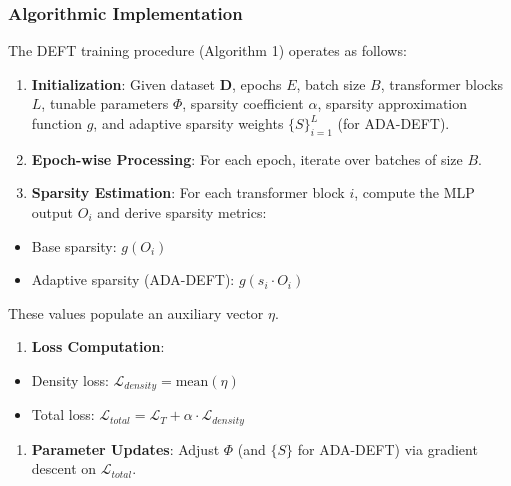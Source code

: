 \documentclass[conference]{IEEEtran}
\begin{document}
\subsubsection*{Algorithmic Implementation}
The DEFT training procedure (Algorithm 1) operates as follows:
\begin{enumerate}
  \item \textbf{Initialization}: Given dataset \(\mathbf{D}\), epochs \(E\), batch size \(B\), transformer blocks \(L\), tunable parameters \(\Phi\), sparsity coefficient \(\alpha\), sparsity approximation function \(g\), and adaptive sparsity weights \(\{S\}_{i=1}^{L}\) (for ADA-DEFT).
  \item \textbf{Epoch-wise Processing}: For each epoch, iterate over batches of size \(B\).
  \item \textbf{Sparsity Estimation}: For each transformer block \(i\), compute the MLP output \(O_i\) and derive sparsity metrics:
\end{enumerate}
\begin{itemize}
  \item Base sparsity: \(g(O_i)\)
  \item Adaptive sparsity (ADA-DEFT): \(g(s_i \cdot O_i)\)
\end{itemize}
These values populate an auxiliary vector \(\eta\).
\begin{enumerate}
  \item \textbf{Loss Computation}:
\end{enumerate}
\begin{itemize}
  \item Density loss: \(\mathcal{L}_{density} = \text{mean}(\eta)\)
  \item Total loss: \(\mathcal{L}_{total} = \mathcal{L}_{T} + \alpha \cdot \mathcal{L}_{density}\)
\end{itemize}
\begin{enumerate}
  \item \textbf{Parameter Updates}: Adjust \(\Phi\) (and \(\{S\}\) for ADA-DEFT) via gradient descent on \(\mathcal{L}_{total}\).
\end{enumerate}
\end{document}
